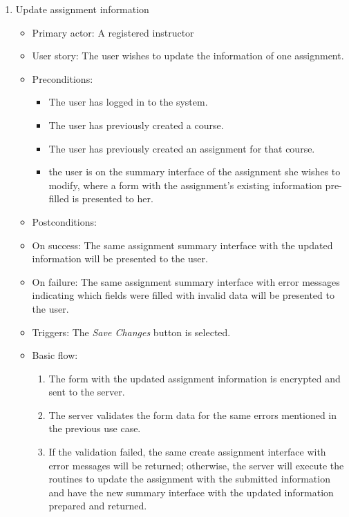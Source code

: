 \begin{enumerate}
\item Update assignment information
\begin{itemize}
    \item Primary actor: A registered instructor
    \item User story: The user wishes to update the information of one
        assignment.
    \item Preconditions:
        \begin{itemize}
            \item The user has logged in to the system.
            \item The user has previously created a course.
            \item The user has previously created an assignment for that course.
            \item the user is on the summary interface of the assignment she
                wishes to modify, where a form with the assignment's existing
                information pre-filled is presented to her.
        \end{itemize}
    \item Postconditions:
        \item On success: The same assignment summary interface with the updated
            information will be presented to the user.
        \item On failure: The same assignment summary interface with error
            messages indicating which fields were filled with invalid data will
            be presented to the user.
    \item Triggers: The \emph{Save Changes} button is selected.
    \item Basic flow:
        \begin{enumerate}
            \item The form with the updated assignment information is encrypted
                and sent to the server.
            \item The server validates the form data for the same errors
                mentioned in the previous use case.
            \item If the validation failed, the same create assignment interface
                with error messages will be returned; otherwise, the server will
                execute the routines to update the assignment with the submitted
                information and have the new summary interface with the updated
                information prepared and returned.
        \end{enumerate}
\end{itemize}


\end{enumerate}
